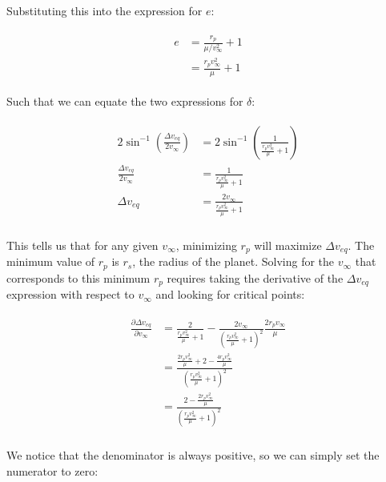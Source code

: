 \documentclass[
]{article}
\begin{document}
Substituting this into the expression for \(e\):

\[\begin{aligned}
\begin{aligned}
    e &= \frac{r_p}{\mu/v_\infty^2} + 1 \\
    &= \frac{r_p v_\infty^2}{\mu} + 1
\end{aligned}
\end{aligned}\]

Such that we can equate the two expressions for \(\delta\):

\[\begin{aligned}
\begin{aligned}
    2 \sin^{-1} \left( \frac{\Delta v_{eq}}{2 v_\infty} \right) &= 2 \sin^{-1} \left( \frac{1}{\frac{r_p v_\infty^2}{\mu} + 1} \right) \\
    \frac{\Delta v_{eq}}{2 v_\infty} &= \frac{1}{\frac{r_p v_\infty^2}{\mu} + 1} \\
    \Delta v_{eq} &= \frac{2 v_\infty}{\frac{r_p v_\infty^2}{\mu} + 1} \\
\end{aligned}
\end{aligned}\]

This tells us that for any given \(v_\infty\), minimizing \(r_p\) will
maximize \(\Delta v_{eq}\). The minimum value of \(r_p\) is \(r_s\), the
radius of the planet. Solving for the \(v_\infty\) that corresponds to
this minimum \(r_p\) requires taking the derivative of the
\(\Delta v_{eq}\) expression with respect to \(v_\infty\) and looking
for critical points:

\[\begin{aligned}
\begin{aligned}
    \frac{\partial \Delta v_{eq}}{\partial v_\infty} &= \frac{2}{\frac{r_p v_\infty^2}{\mu} + 1} - \frac{2 v_\infty}{\left( \frac{r_p v_\infty^2}{\mu} + 1 \right)^2} \frac{2 r_p v_\infty}{\mu} \\
    &= \frac{\frac{2r_p v_\infty^2}{\mu} + 2 - \frac{4r_p v_\infty^2}{\mu}}{\left( \frac{r_p v_\infty^2}{\mu} + 1 \right)^2} \\
    &= \frac{2 - \frac{2r_p v_\infty^2}{\mu}}{\left( \frac{r_p v_\infty^2}{\mu} + 1 \right)^2} \\
\end{aligned}
\end{aligned}\]

We notice that the denominator is always positive, so we can simply set
the numerator to zero:
\end{document}
